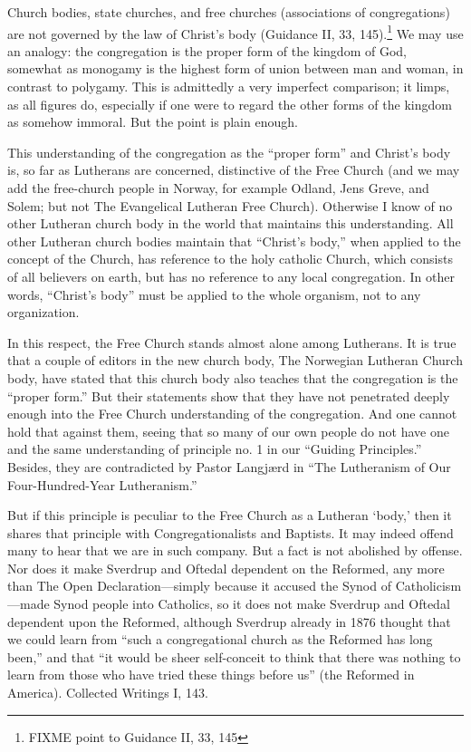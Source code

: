 Church bodies, state churches, and free churches (associations of congregations) are not governed by the law of Christ’s body (Guidance II, 33, 145).\footnote{FIXME point to Guidance II, 33, 145} We may use an analogy: the congregation is the proper form of the kingdom of God, somewhat as monogamy is the highest form of union between man and woman, in contrast to polygamy. This is admittedly a very imperfect comparison; it limps, as all figures do, especially if one were to regard the other forms of the kingdom as somehow immoral. But the point is plain enough.

This understanding of the congregation as the “proper form” and Christ’s body is, so far as Lutherans are concerned, distinctive of the Free Church (and we may add the free-church people in Norway, for example Odland, Jens Greve, and Solem; but not The Evangelical Lutheran Free Church). Otherwise I know of no other Lutheran church body in the world that maintains this understanding. All other Lutheran church bodies maintain that “Christ’s body,” when applied to the concept of the Church, has reference to the holy catholic Church, which consists of all believers on earth, but has no reference to any local congregation. In other words, “Christ’s body” must be applied to the whole organism, not to any organization.


In this respect, the Free Church stands almost alone among Lutherans. It is true that a couple of editors in the new church body, The Norwegian Lutheran Church body, have stated that this church body also teaches that the congregation is the “proper form.” But their statements show that they have not penetrated deeply enough into the Free Church understanding of the congregation. And one cannot hold that against them, seeing that so many of our own people do not have one and the same understanding of principle no. 1 in our “Guiding Principles.” Besides, they are contradicted by Pastor Langjærd in “The Lutheranism of Our Four-Hundred-Year Lutheranism.”

But if this principle is peculiar to the Free Church as a Lutheran ‘body,’ then it shares that principle with Congregationalists and Baptists. It may indeed offend many to hear that we are in such company. But a fact is not abolished by offense. Nor does it make Sverdrup and Oftedal dependent on the Reformed, any more than The Open Declaration—simply because it accused the Synod of Catholicism—made Synod people into Catholics, so it does not make Sverdrup and Oftedal dependent upon the Reformed, although Sverdrup already in 1876 thought that we could learn from “such a congregational church as the Reformed has long been,” and that “it would be sheer self-conceit to think that there was nothing to learn from those who have tried these things before us” (the Reformed in America). Collected Writings I, 143.

